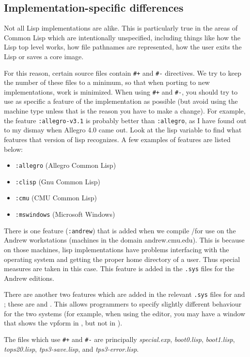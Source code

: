 \subsection{Implementation-specific differences}\label{sect:impl-spec-diffs}
Not all Lisp implementations are alike.  This is
particularly true in the areas of Common Lisp which are intentionally
unspecified, including things like how the Lisp top level works, how
file pathnames are represented, how the user exits the Lisp or saves
a core image. 

For this reason, certain \TPS source files contain 
{\tt \#+} and {\tt \#-} directives.  We try to keep the number of these
files to a minimum, so that when porting to new implementations, work
is minimized.  When using {\tt \#+} and {\tt \#-}, you should try to use as
specific a feature of the implementation as possible (but avoid using
the machine type unless that is the reason you have to make a change).
For example, the feature {\tt :allegro-v3.1} is probably better than
{\tt :allegro}, as I have found out to my dismay when Allegro 4.0 came
out.  Look at the lisp variable  to find what features that
version of lisp recognizes.  A few examples of features are listed below:
\begin{itemize}
  \item {\tt :allegro}  (Allegro Common Lisp)
  \item {\tt :clisp}  (Gnu Common Lisp)
  \item {\tt :cmu}  (CMU Common Lisp)
  \item {\tt :mswindows} (Microsoft Windows)
\end{itemize}

There is one feature ({\tt :andrew}) that is added when we compile \TPS/\ETPS for use
on the Andrew workstations (machines in the domain andrew.cmu.edu).
This is because on those machines, lisp implementations have problems
interfacing with the operating system and getting the proper home
directory of a user.  Thus special measures are taken in this case.
This feature is added in the {\tt .sys} files for the Andrew editions.

There are another two features which are added in the relevant {\tt .sys}
files for \ETPS and \TPS; these are  and .
This allows programmers to specify slightly different behaviour for the 
two systems (for example, when using the editor, you may have a window that
shows the vpform in \tps, but not in \ETPS).

The files which use {\tt \#+} and {\tt \#-} are principally {\it special.exp},
{\it boot0.lisp}, {\it boot1.lisp}, {\it tops20.lisp}, {\it tps3-save.lisp},
and {\it tps3-error.lisp}.

